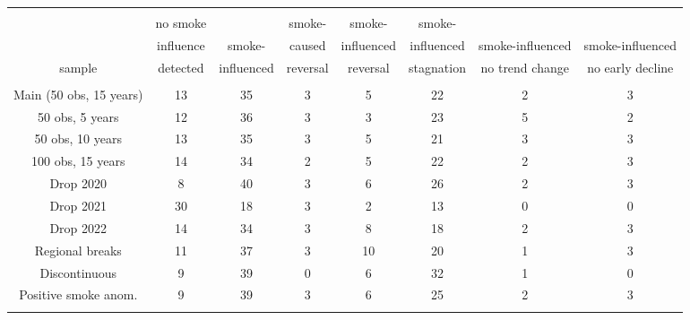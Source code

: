 \documentclass{article}
\begin{document}
\thispagestyle{empty}

\begin{table}[!htbp] \centering 
    \hspace*{-2.9cm}
\footnotesize 
\begin{tabular}{@{\extracolsep{5pt}} cccccccc} 
\\[-1.8ex]\hline 
\hline \\[-1.8ex] 
    & no smoke  &  & smoke- & smoke- & smoke-  &  & \\ 
    & influence  & smoke- & caused & influenced & influenced & smoke-influenced  & smoke-influenced \\ 
sample & detected  & influenced & reversal & reversal & stagnation & no trend change & no early decline \\ 
\hline \\[-1.8ex] 
Main (50 obs, 15 years) & 13 & 35 & 3 & 5 & 22 & 2 & 3 \\ 
50 obs, 5 years & 12 & 36 & 3 & 3 & 23 & 5 & 2 \\ 
50 obs, 10 years & 13 & 35 & 3 & 5 & 21 & 3 & 3 \\ 
100 obs, 15 years & 14 & 34 & 2 & 5 & 22 & 2 & 3 \\ 
Drop 2020 & 8 & 40 & 3 & 6 & 26 & 2 & 3 \\ 
Drop 2021 & 30 & 18 & 3 & 2 & 13 & 0 & 0 \\ 
Drop 2022 & 14 & 34 & 3 & 8 & 18 & 2 & 3 \\ 
Regional breaks & 11 & 37 & 3 & 10 & 20 & 1 & 3 \\ 
Discontinuous & 9 & 39 & 0 & 6 & 32 & 1 & 0 \\ 
Positive smoke anom. & 9 & 39 & 3 & 6 & 25 & 2 & 3 \\ 
\hline \\[-1.8ex] 
\end{tabular} 
\end{table} 
\end{document}
